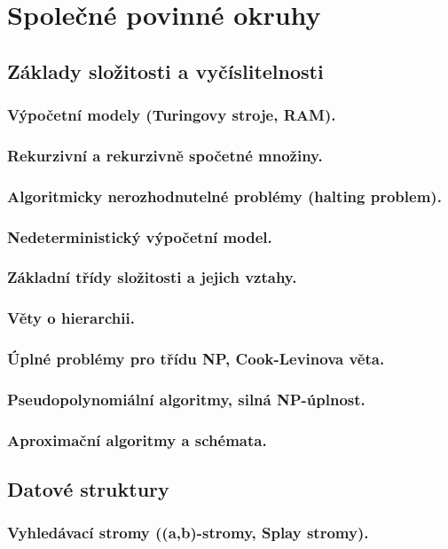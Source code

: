 \documentclass[11pt]{report} %
\begin{document}
	
\tableofcontents
\part{Společné povinné okruhy}
\chapter{Základy složitosti a vyčíslitelnosti}
\section{Výpočetní modely (Turingovy stroje, RAM).}
\section{Rekurzivní a rekurzivně spočetné množiny.}
\section{Algoritmicky nerozhodnutelné problémy (halting problem).}
\section{Nedeterministický výpočetní model.}
\section{Základní třídy složitosti a jejich vztahy.}
\section{Věty o hierarchii.}
\section{Úplné problémy pro třídu NP, Cook-Levinova věta.}
\section{Pseudopolynomiální algoritmy, silná NP-úplnost.}
\section{Aproximační algoritmy a schémata.}

\chapter{Datové struktury}
\section{Vyhledávací stromy ((a,b)-stromy, Splay stromy).}
\end{document}
